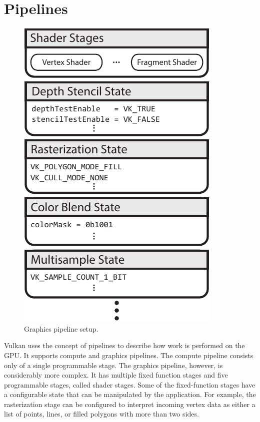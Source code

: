   \section{Pipelines}
  \label{sec:Pipelines}

    \begin{figure}
      \centering
      \includegraphics{Main/Images/GraphicsPipeline}
      \caption{Graphics pipeline setup.}
      \label{fig:GraphicsPipeline}
    \end{figure}

    Vulkan uses the concept of pipelines to describe how work is performed on the GPU. It supports compute and graphics pipelines. The compute pipeline consists only of a single programmable stage. The graphics pipeline, however, is considerably more complex. It has multiple fixed function stages and five programmable stages, called shader stages. Some of the fixed-function stages have a configurable state that can be manipulated by the \gls{application}. For example, the rasterization stage can be configured to interpret incoming vertex data as either a list of points, lines, or filled polygons with more than two sides.

